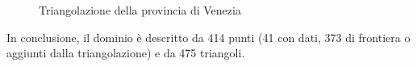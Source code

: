 \documentclass[a4paper,11pt,twoside,openright]{book}							%
\begin{document}
\begin{figure}[t]
\centering
{}
\caption{Triangolazione della provincia di Venezia}
\label{fig:Ven_triang}
\end{figure}

In conclusione, il dominio è descritto da 414 punti (41 con dati, 373 di frontiera o aggiunti dalla triangolazione) e da 475 triangoli.
\end{document}
